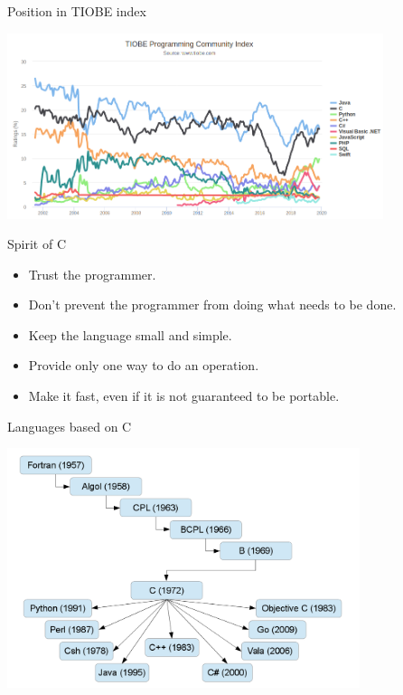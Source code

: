 \begin{frame}{Position in TIOBE index}
    \begin{center}
        \includegraphics[width=11cm]{tiobe_5.png}
    \end{center}
\end{frame}
\begin{frame}{Spirit of C}
    \begin{itemize}
        \item Trust the programmer.
        \pause \item Don’t prevent the programmer from doing what needs to be done.
        \pause \item Keep the language small and simple.
        \pause \item Provide only one way to do an operation.
        \pause \item Make it fast, even if it is not guaranteed to be portable.
    \end{itemize}
\end{frame}
\begin{frame}{Languages based on C}
    \begin{center}
        \includegraphics[height=7cm]{ctree.png}
    \end{center}
\end{frame}
